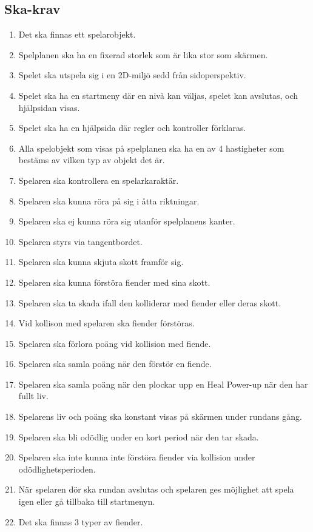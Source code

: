 \documentclass{TDP005mall}
\begin{document}
\subsection{Ska-krav}
\begin{enumerate}
\item Det ska finnas ett spelarobjekt.
\item Spelplanen ska ha en fixerad storlek som är lika stor som skärmen.
\item Spelet ska utspela sig i en 2D-miljö sedd från sidoperspektiv.
\item Spelet ska ha en startmeny där en nivå kan väljas, spelet kan avslutas, och hjälpsidan visas.
\item Spelet ska ha en hjälpsida där regler och kontroller förklaras.
\item Alla spelobjekt som visas på spelplanen ska ha en av 4 hastigheter som bestäms av vilken typ av objekt det är.
\item Spelaren ska kontrollera en spelarkaraktär.
\item Spelaren ska kunna röra på sig i åtta riktningar.
\item Spelaren ska ej kunna röra sig utanför spelplanens kanter.
\item Spelaren styrs via tangentbordet.
\item Spelaren ska kunna skjuta skott framför sig.
\item Spelaren ska kunna förstöra fiender med sina skott.
\item Spelaren ska ta skada ifall den kolliderar med fiender eller deras skott.
\item Vid kollison med spelaren ska fiender förstöras.
\item Spelaren ska förlora poäng vid kollision med fiende.
\item Spelaren ska samla poäng när den förstör en fiende.
\item Spelaren ska samla poäng när den plockar upp en Heal Power-up när den har fullt liv.
\item Spelarens liv och poäng ska konstant visas på skärmen under rundans gång.
\item Spelaren ska bli odödlig under en kort period när den tar skada.
\item Spelaren ska inte kunna inte förstöra fiender via kollision under odödlighetsperioden.
\item När spelaren dör ska rundan avslutas och spelaren ges möjlighet att spela igen eller gå tillbaka till startmenyn. 
\item Det ska finnas 3 typer av fiender.

\end{enumerate}
\end{document}
